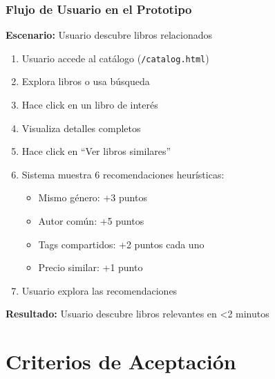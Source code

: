 \documentclass[aspectratio=169]{beamer}
\begin{document}
\begin{frame}
\frametitle{Flujo de Usuario en el Prototipo}

\textbf{Escenario:} Usuario descubre libros relacionados

\begin{enumerate}
\item Usuario accede al catálogo (\texttt{/catalog.html})
\item Explora libros o usa búsqueda
\item Hace click en un libro de interés
\item Visualiza detalles completos
\item Hace click en ``Ver libros similares''
\item Sistema muestra 6 recomendaciones heurísticas:
  \begin{itemize}
  \item Mismo género: +3 puntos
  \item Autor común: +5 puntos
  \item Tags compartidos: +2 puntos cada uno
  \item Precio similar: +1 punto
  \end{itemize}
\item Usuario explora las recomendaciones
\end{enumerate}

\vspace{0.3cm}

\textbf{Resultado:} Usuario descubre libros relevantes en <2 minutos

\end{frame}

\section{Criterios de Aceptación}
\end{document}
